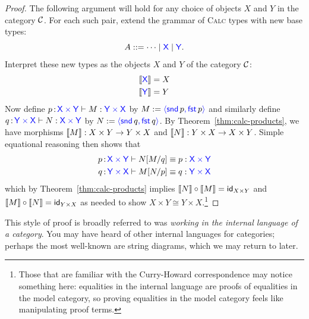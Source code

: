 \begin{proof}
  The following argument will hold for any choice of objects 
  $X$ and $Y$ in the category $\mathcal C$.
  For each such pair,
  extend the grammar of \textsc{Calc} types with new base types:
  \[
  A ::= \dots \mid \mathsf{{\color{blue}X}} \mid \mathsf{{\color{blue}Y}}.
  \]
  Interpret these new types as the objects \(X\) and \(Y\) of the category \(\mathcal C\):
  \begin{align*}
    \left\llbracket \mathsf{{\color{blue}X}}\right\rrbracket &= X \\
    \left\llbracket \mathsf{{\color{blue}Y}}\right\rrbracket &= Y
  \end{align*}
  Now define \(p \,{:}\, \mathsf{{\color{blue}X}} \mathbin{{\color{blue}\times}} \mathsf{{\color{blue}Y}} \vdash M : \mathsf{{\color{blue}Y}} \mathbin{{\color{blue}\times}} \mathsf{{\color{blue}X}}\) by
  \(
  M := \plpair{\plsnd{p}}{\plfst{p}}
  \)
  and similarly define
  \(q \,{:}\, \mathsf{{\color{blue}Y}} \mathbin{{\color{blue}\times}} \mathsf{{\color{blue}X}} \vdash N : \mathsf{{\color{blue}X}} \mathbin{{\color{blue}\times}} \mathsf{{\color{blue}Y}}\) by
  \(N := \plpair{\plsnd{q}}{\plfst{q}}\).
  By Theorem~\ref{thm:calc-products},
  we have morphisms \(\left\llbracket M\right\rrbracket : X \times Y \to Y \times X\)
  and \(\left\llbracket N\right\rrbracket : Y \times X \to X \times Y\).
  Simple equational reasoning then shows that
  \begin{align}
    p\,{:}\,\mathsf{{\color{blue}X}}\mathbin{{\color{blue}\times}}\mathsf{{\color{blue}Y}} \vdash N[M/q] &\equiv p : \mathsf{{\color{blue}X}}\mathbin{{\color{blue}\times}}\mathsf{{\color{blue}Y}}
    \\
    q\,{:}\,\mathsf{{\color{blue}Y}}\mathbin{{\color{blue}\times}}\mathsf{{\color{blue}X}} \vdash M[N/p] &\equiv q : \mathsf{{\color{blue}Y}}\mathbin{{\color{blue}\times}}\mathsf{{\color{blue}X}}
  \end{align}
  which by Theorem~\ref{thm:calc-products}
  implies \(\left\llbracket N\right\rrbracket \circ \left\llbracket M\right\rrbracket = \mathsf{id}_{X\times Y}\)
  and \(\left\llbracket M\right\rrbracket \circ \left\llbracket N\right\rrbracket = \mathsf{id}_{Y\times X}\)
  as needed to show \(X \times Y \cong Y \times X\).\footnote{Those that are familiar 
  with the Curry-Howard correspondence may notice something here:
  equalities in the internal language are proofs of equalities in the model category, 
  so proving equalities in the model category feels like manipulating proof 
  terms.}
\end{proof}

This style of proof is broadly referred to was \emph{working in the internal 
language of a category}. You may have heard of other internal languages for
categories; perhaps the most well-known are string diagrams, which we may return
to later. 

